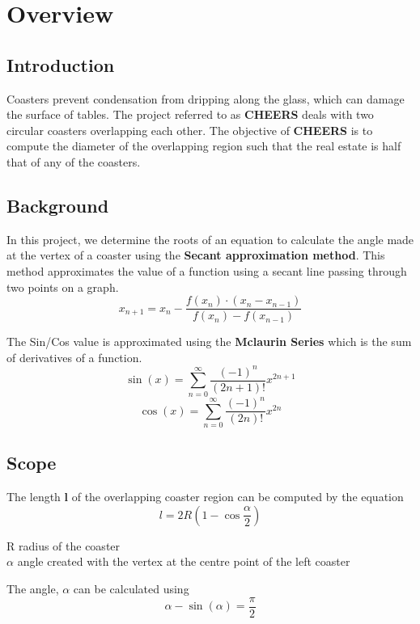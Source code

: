 \documentclass{report}
\begin{document}
\tableofcontents{}
\printindex{}

\chapter{Overview}
\section{Introduction}
  Coasters prevent condensation from dripping along the glass, which can damage the surface of tables. The project referred to as \textbf {CHEERS} deals with two circular coasters overlapping each other. The objective of \textbf {CHEERS} is to compute the diameter of the overlapping region such that 
  the real estate is half that of any of the coasters.

\section{Background}
  In this project, we determine the roots of an equation to calculate the angle made at the vertex of a coaster using the \textbf{Secant approximation method}. This method approximates the value of a function using a secant line passing through two points on a graph.
  $$ x_{n+1} = x_n - \frac{f(x_n) \cdot (x_n - x_{n-1})}{f(x_n) - f(x_{n-1})} $$

  \vspace*{20pt}
  \noindent The Sin/Cos value is approximated using the \textbf{Mclaurin Series} which is the sum of derivatives of a function.
  $$\sin(x) = \sum_{n=0}^{\infty} \frac{(-1)^n}{(2n+1)!}x^{2n+1}$$
  $$\cos(x) = \sum_{n=0}^{\infty} \frac{(-1)^n}{(2n)!}x^{2n}$$ 

\section{Scope}
  The length \textbf{l} of the overlapping coaster region can be computed by the equation
  $$l = 2R\left(1 - \cos\frac{\alpha}{2}\right)$$

  \indent R \textrightarrow \;radius of the coaster \\
  \indent $\alpha$ \textrightarrow \;angle created with the vertex at the centre point of the left coaster

  \vspace{20pt}
  The angle, $\alpha$ can be calculated using
  $$\alpha - \sin(\alpha) = \frac{\pi}{2}$$
  
  \vspace*{20pt}
  
\end{document}
